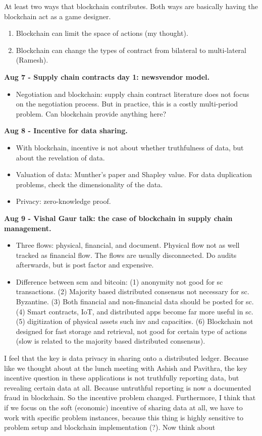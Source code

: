 \documentclass{article}
\newcommand{\pa}[1]{\noindent\textbf{\textsf{#1}}}
\begin{document}
At least two ways that blockchain contributes. Both ways are basically having the blockchain act as a game designer.
\begin{enumerate}
\item Blockchain can limit the space of actions (my thought).
\item Blockchain can change the types of contract from bilateral to multi-lateral (Ramesh).
\end{enumerate}

\pa{Aug 7 - Supply chain contracts day 1: newsvendor model.}

\begin{itemize}
\item Negotiation and blockchain: supply chain contract literature does not focus on the negotiation process. But in practice, this is a costly multi-period problem. Can blockchain provide anything here?
\end{itemize}

\pa{Aug 8 - Incentive for data sharing.}
\begin{itemize}
\item With blockchain, incentive is not about whether truthfulness of data, but about the revelation of data. 
\item Valuation of data: Munther's paper and Shapley value. For data duplication problems, check the dimensionality of the data.
\item Privacy: zero-knowledge proof.
\end{itemize}

\pa{Aug 9 - Vishal Gaur talk: the case of blockchain in supply chain management.}

\begin{itemize}
\item Three flows: physical, financial, and document. Physical flow not as well tracked as financial flow. The flows are usually disconnected. Do audits afterwards, but is post factor and expensive. 
\item Difference between scm and bitcoin: (1) anonymity not good for sc transactions. (2) Majority based distributed consensus not necessary for sc. Byzantine. (3) Both financial and non-financial data should be posted for sc. (4) Smart contracts, IoT, and distributed apps become far more useful in sc. (5) digitization of physical assets such inv and capacities. (6) Blockchain not designed for fast storage and retrieval, not good for certain type of actions (slow is related to the majority based distributed consensus). 
\end{itemize}

I feel that the key is data privacy in sharing onto a distributed ledger. Because like we thought about at the lunch meeting with Ashish and Pavithra, the key incentive question in these applications is not truthfully reporting data, but revealing certain data at all. Because untruthful reporting is now a documented fraud in blockchain. So the incentive problem changed. Furthermore, I think that if we focus on the soft (economic) incentive of sharing data at all, we have to work with specific problem instances, because this thing is highly sensitive to problem setup and blockchain implementation (?). Now think about 
\end{document}

